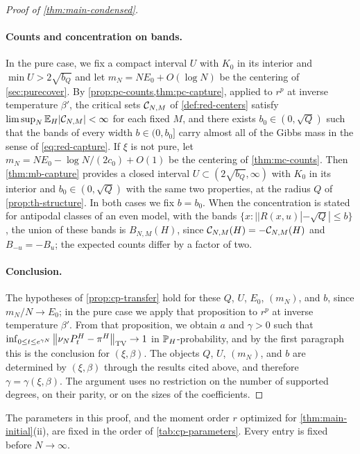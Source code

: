 \begin{proof}[Proof of \cref{thm:main-condensed}]
\paragraph{Counts and concentration on bands.}
In the pure case, we fix a compact interval $U$ with $K_0$ in its interior and $\min U>2\sqrt{b_Q}$ and let $m_N=NE_0+O(\log N)$ be the centering of \cref{sec:purecover}. By \cref{prop:pc-counts,thm:pc-capture}, applied to $r^p$ at inverse temperature $\beta'$, the critical sets $\mathcal C_{N,M}$ of \cref{def:red-centers} satisfy $\limsup_N\mathbb E_H|\mathcal C_{N,M}|<\infty$ for each fixed $M$, and there exists $b_0\in(0,\sqrt Q)$ such that the bands of every width $b\in(0,b_0]$ carry almost all of the Gibbs mass in the sense of \eqref{eq:red-capture}. If $\xi$ is not pure, let $m_N=NE_0-\log N/(2c_0)+O(1)$ be the centering of \cref{thm:mc-counts}. Then \cref{thm:mb-capture} provides a closed interval $U\subset(2\sqrt{b_Q},\infty)$ with $K_0$ in its interior and $b_0\in(0,\sqrt Q)$ with the same two properties, at the radius $Q$ of \cref{prop:th-structure}. In both cases we fix $b=b_0$. When the concentration is stated for antipodal classes of an even model, with the bands $\{x:||R(x,u)|-\sqrt Q|\le b\}$, the union of these bands is $B_{N,M}(H)$, since $\mathcal C_{N,M}(H)=-\mathcal C_{N,M}(H)$ and $B_{-u}=-B_u$; the expected counts differ by a factor of two.

\paragraph{Conclusion.}
The hypotheses of \cref{prop:cp-transfer} hold for these $Q$, $U$, $E_0$, $(m_N)$, and $b$, since $m_N/N\to E_0$; in the pure case we apply that proposition to $r^p$ at inverse temperature $\beta'$. From that proposition, we obtain $a$ and $\gamma>0$ such that $\inf_{0\le t\le e^{\gamma N}}\left\lVert\nu_NP^H_t-\pi^H\right\rVert_{\mathrm{TV}}\to1$ in $\mathbb P_H$-probability, and by the first paragraph this is the conclusion for $(\xi,\beta)$. The objects $Q$, $U$, $(m_N)$, and $b$ are determined by $(\xi,\beta)$ through the results cited above, and therefore $\gamma=\gamma(\xi,\beta)$. The argument uses no restriction on the number of supported degrees, on their parity, or on the sizes of the coefficients.
\end{proof}

The parameters in this proof, and the moment order $r$ optimized for \cref{thm:main-initial}(ii), are fixed in the order of \cref{tab:cp-parameters}. Every entry is fixed before $N\to\infty$.


